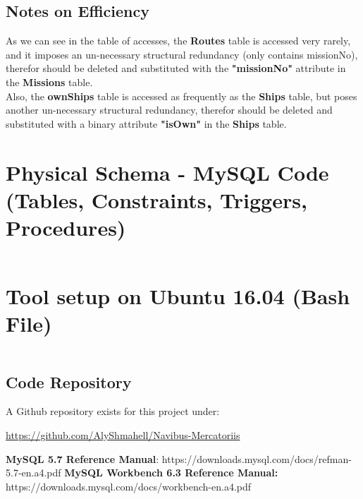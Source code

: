 \documentclass[12pt]{scrartcl}
\begin{document}
\subsection*{Notes on Efficiency}
As we can see in the table of accesses, the \textbf{Routes} table is accessed very rarely, and it imposes an un-necessary structural redundancy (only contains missionNo), therefor should be deleted and substituted with the \textbf{"missionNo"} attribute in the \textbf{Missions} table.\\

Also, the \textbf{ownShips} table is accessed as frequently as the \textbf{Ships} table, but poses another un-necessary structural redundancy, therefor should be deleted and substituted with a binary attribute \textbf{"isOwn"} in the \textbf{Ships} table.
\newpage
\section*{Physical Schema - MySQL Code (Tables, Constraints, Triggers, Procedures)}
\inputminted[breaklines=true, fontsize=\footnotesize]{mysql}{../../MySQL Code/AlyShmahell-mercantileShips.sql}
\newpage
\section*{Tool setup on Ubuntu 16.04 (Bash File)}
\inputminted[breaklines=true, fontsize=\footnotesize]{bash}{../../prerequisites.sh}
\newpage
\begin{flushleft}
	\section*{\textbf{Code Repository}}
\end{flushleft}
\begin{flushleft}
	A Github repository exists for this project under:\\
\end{flushleft}
	\begin{center}
		\url{https://github.com/AlyShmahell/Navibus-Mercatoriis}
	\end{center}
\begin{thebibliography}{}
\textbf{MySQL 5.7 Reference Manual}: https://downloads.mysql.com/docs/refman-5.7-en.a4.pdf
\textbf{MySQL Workbench 6.3 Reference Manual:} https://downloads.mysql.com/docs/workbench-en.a4.pdf
\end{thebibliography}
\end{document}

